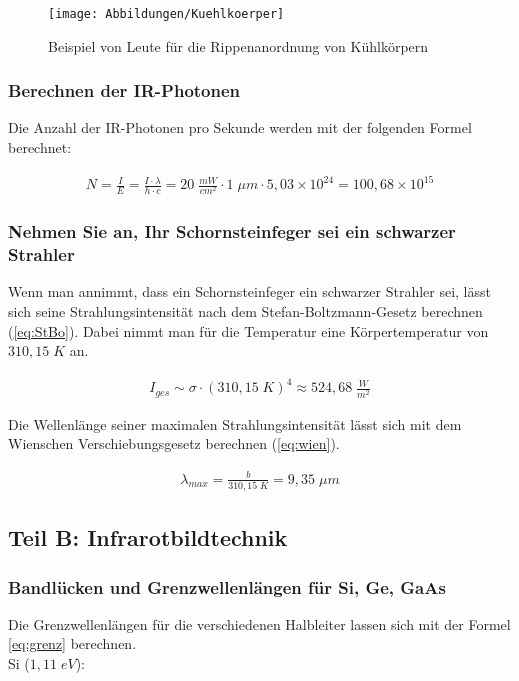 \documentclass[a4paper]{scrartcl}
\numberwithin{equation}{subsection}
\begin{document}
\begin{figure}[H]
\texttt{[image: Abbildungen/Kuehlkoerper]}
\centering
\caption{Beispiel von Leute für die Rippenanordnung von Kühlkörpern \cite{anl}}
\centering
\label{fig:kuehl}
\end{figure}

\subsubsection{Berechnen der IR-Photonen}
Die Anzahl der IR-Photonen pro Sekunde werden mit der folgenden Formel berechnet:

\begin{align*}
N = \frac{I}{E} = \frac{I\cdot \lambda}{h\cdot c} = 20\;\frac{mW}{cm^2} \cdot 1\;\mu m \cdot 5,03\times 
10^{24} = 100,68\times 10^{15}
\end{align*}

\subsubsection{Nehmen Sie an, Ihr Schornsteinfeger sei ein schwarzer Strahler}
Wenn man annimmt, dass ein Schornsteinfeger ein schwarzer Strahler sei, lässt sich seine Strahlungsintensität nach dem Stefan-Boltzmann-Gesetz berechnen (\ref{eq:StBo}).
Dabei nimmt man für die Temperatur eine Körpertemperatur von $310,15\;K$ an.

\begin{align*}
I_{ges}\sim\sigma\cdot (310,15\;K)^4 \approx 524,68\;\frac{W}{m^2}
\end{align*}

Die Wellenlänge seiner maximalen Strahlungsintensität lässt sich mit dem Wienschen Verschiebungsgesetz berechnen (\ref{eq:wien}).

\begin{align*}
\lambda_{max} = \frac{b}{310,15\;K} = 9,35\; \mu m
\end{align*}

\subsection{Teil B: Infrarotbildtechnik}
\subsubsection{Bandlücken und Grenzwellenlängen für Si, Ge, GaAs}
Die Grenzwellenlängen für die verschiedenen Halbleiter lassen sich mit der Formel \ref{eq:grenz} berechnen.\\
Si ($1,11\;eV$):
\end{document}
